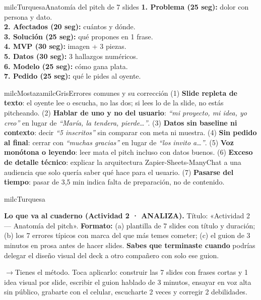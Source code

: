 \documentclass[11pt,letterpaper]{article}
\newcommand{\puente}[1]{%
  \begin{puentebox}%
    \textcolor{milcGradeDark}{$\rightarrow$}\hspace{2mm}#1%
  \end{puentebox}%
}
\begin{document}
\begin{drawbox}{milcTurquesa}{Anatomía del pitch de 7 slides}
\textbf{1. Problema (25 seg):} dolor con persona y dato. \\[1mm] \textbf{2. Afectados (20 seg):} cuántos y dónde. \\[1mm] \textbf{3. Solución (25 seg):} qué propones en 1 frase. \\[1mm] \textbf{4. MVP (30 seg):} imagen + 3 piezas. \\[1mm] \textbf{5. Datos (30 seg):} 3 hallazgos numéricos. \\[1mm] \textbf{6. Modelo (25 seg):} cómo gana plata. \\[1mm] \textbf{7. Pedido (25 seg):} qué le pides al oyente.
\end{drawbox}

\begin{softbox}{milcMostaza}{milcGris}{Errores comunes y su corrección}
(1) \textbf{Slide repleta de texto}: el oyente lee o escucha, no las dos; si lees lo de la slide, no estás pitcheando. (2) \textbf{Hablar de uno y no del usuario}: \emph{``mi proyecto, mi idea, yo creo''} en lugar de \emph{``María, la tendera, pierde…''}. (3) \textbf{Datos sin baseline ni contexto}: decir \emph{``5 inscritos''} sin comparar con meta ni muestra. (4) \textbf{Sin pedido al final}: cerrar con \emph{``muchas gracias''} en lugar de \emph{``los invito a…''}. (5) \textbf{Voz monótona o leyendo}: leer mata el pitch incluso con datos buenos. (6) \textbf{Exceso de detalle técnico}: explicar la arquitectura Zapier-Sheets-ManyChat a una audiencia que solo quería saber qué hace para el usuario. (7) \textbf{Pasarse del tiempo}: pasar de 3,5 min indica falta de preparación, no de contenido.
\end{softbox}

\begin{infoband}{milcTurquesa}


\textbf{Lo que va al cuaderno (Actividad 2 · ANALIZA).} Título: «Actividad 2 --- Anatomía del pitch». \textbf{Formato:} (a) plantilla de 7 slides con título y duración; (b) los 7 errores típicos con marca del que más temes cometer; (c) el guion de 3 minutos en prosa antes de hacer slides. \textbf{Sabes que terminaste cuando} podrías delegar el diseño visual del deck a otro compañero con solo ese guion.
\end{infoband}

\puente{Tienes el método. Toca aplicarlo: construir las 7 slides con frases cortas y 1 idea visual por slide, escribir el guion hablado de 3 minutos, ensayar en voz alta sin público, grabarte con el celular, escucharte 2 veces y corregir 2 debilidades.}
\end{document}
